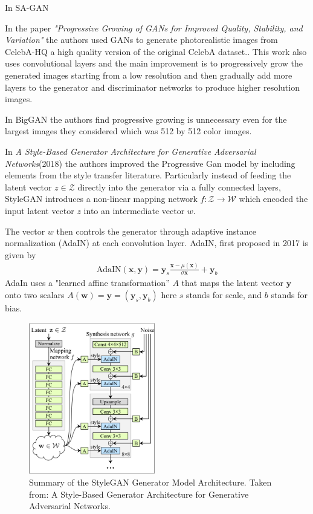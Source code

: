 In SA-GAN\cite{sagan}

In the paper \textit{"Progressive Growing of GANs for Improved Quality, Stability, and Variation"}\cite{progan} the authors used GANs to generate photorealistic images from CelebA-HQ a high quality version of the original CelebA dataset.\cite{celebA}. This work also uses convolutional layers and the main improvement is to progressively grow the generated images starting from a low resolution and then gradually add more layers to the generator and discriminator networks to produce higher resolution images.

In BigGAN \cite{biggan} the authors find progressive growing is unnecessary even for the largest images they considered which was 512 by 512 color images.

In \textit{A Style-Based Generator Architecture for Generative Adversarial Networks}(2018)\cite{stylegan} the authors improved the Progressive Gan model by including elements from the style transfer literature. Particularly instead of feeding the latent vector $z\in\mathcal{Z}$ directly into the generator via a fully connected layers, StyleGAN introduces a non-linear mapping network $f:\mathcal{Z}\to\mathcal{W}$ which encoded the input latent vector $z$ into an intermediate vector $w$.

The vector $w$ then controls the generator through adaptive instance normalization (AdaIN) at each convolution layer.
AdaIN, first proposed in 2017 \cite{adain} is given by
\begin{align}
  \text{AdaIN}(\mathbf{x},\mathbf{y}) = \mathbf{y}_s \frac{\mathbf{x}-\mu(\mathbf{x})}{\sigma{\mathbf{x}}}+\mathbf{y}_b
\end{align}
AdaIn uses a "learned affine transformation” $A$ that maps the latent  vector $\mathbf{y}$ onto two scalars $A(\mathbf{w})= \mathbf{y}=(\mathbf{y}_s,\mathbf{y}_b)$ here $s$ stands for scale, and $b$ stands for bias.

\begin{figure}
\includegraphics[width=5.5cm]{fig/stylegan-arch}
\caption{Summary of the StyleGAN Generator Model Architecture.
Taken from: A Style-Based Generator Architecture for Generative Adversarial Networks.\cite{stylegan}}
\label{stylegan-arch}
\end{figure}

